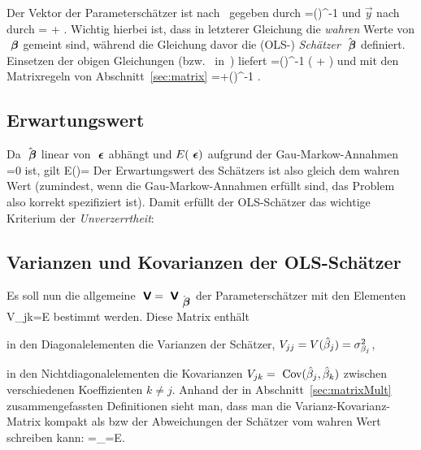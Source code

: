 Der Vektor der Parametersch\"atzer ist
nach~ gegeben durch
\bdm
\hatvecbeta =\left(\tr{}\right)^{-1}\tr{}
\edm
und $\vec{y}$ nach~ durch
\bdm
{}=\cdot \vec{\beta} + \veceps.
\edm
Wichtig hierbei ist, dass in letzterer Gleichung die \emph{wahren}
Werte von ${\mbox{ \boldmath {$\beta$}}}$ gemeint sind, w\"ahrend die Gleichung davor die
(OLS-) \emph{Sch\"atzer} $\hat{{\mbox{ \boldmath {$\beta$}}}}$ definiert.
Einsetzen der obigen Gleichungen (bzw.~
in~) liefert
\bdm
\hatvecbeta=\left(\tr{}\right)^{-1}\tr
 \left(\cdot \vec{\beta} + \veceps\right)
\edm
und mit den Matrixregeln von Abschnitt~\ref{sec:matrix}
\be
\label{betaeps}
\hatvecbeta=\vec{\beta}+\left(\tr{}\right)^{-1}
\tr\veceps.
\ee


\subsection{\label{sec:linErw}Erwartungswert}
Da $\hat{{\mbox{ \boldmath {$\beta$}}}}$ linear von ${\mbox{ \boldmath {$\epsilon$}}}$ abh\"angt und $E({\mbox{ \boldmath {$\epsilon$}}})$
aufgrund der Gau\3-Markow-Annahmen =0 ist, gilt
\be
\label{erwbeta}
E(\hatvecbeta)=\vec{\beta}
\ee
Der Erwartungswert des Sch\"atzers ist also gleich dem wahren Wert
(zumindest, wenn die Gau\3-Markow-Annahmen erf\"ullt sind, das Problem
also korrekt spezifiziert ist). Damit erf\"ullt der OLS-Sch\"atzer das
wichtige Kriterium der \emph{Unverzerrtheit}:


\subsection{\label{sec:linVar}Varianzen und Kovarianzen der OLS-Sch\"atzer}
Es soll nun die allgemeine 
${\mbox{ \sf\textbf{V}}}={\mbox{ \sf\textbf{V}}}_{\hat{{\mbox{ \boldmath {$\beta$}}}}}$ der Parametersch\"atzer
mit den Elementen
\be
\label{Vijbeta} 
V_{jk}=E
\ee
bestimmt werden. Diese Matrix enth\"alt
\bi
\item in den Diagonalelementen die Varianzen der Sch\"atzer,
$V_{jj}=V(\hat{\beta}_j)=\sigma_{\beta_j}^2$,
\item in den Nichtdiagonalelementen die Kovarianzen
$V_{jk}={\mbox{ Cov}}(\hat{\beta}_j,\hat{\beta}_k)$ zwischen verschiedenen
Koeffizienten $k\neq j$.
\ei
Anhand der in Abschnitt~\ref{sec:matrixMult} zusammengefassten
Definitionen sieht man, dass man die Varianz-Kovarianz-Matrix kompakt
als  bzw  der Abweichungen der Sch\"atzer vom wahren
Wert schreiben kann:
\be
\label{VbetaTensor}
=_{\hatvecbeta}=E\left[ (\hatvecbeta-\vecbeta) (\hatvecbeta-\vecbeta)\tr\right].
\ee

